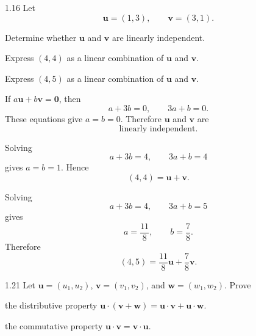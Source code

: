 \documentclass[11pt,oneside]{article}
\begin{document}
\begin{problem}{1.16}
Let
\[
    \mathbf u=(1,3),
    \qquad
    \mathbf v=(3,1).
\]
\begin{problemsubparts}
    \item Determine whether $\mathbf u$ and $\mathbf v$ are linearly independent.
    \item Express $(4,4)$ as a linear combination of $\mathbf u$ and $\mathbf v$.
    \item Express $(4,5)$ as a linear combination of $\mathbf u$ and $\mathbf v$.
\end{problemsubparts}
\end{problem}

\begin{solution}
\begin{problemsubparts}
    \item If $a\mathbf u+b\mathbf v=\mathbf 0$, then
    \[
        a+3b=0,
        \qquad
        3a+b=0.
    \]
    These equations give $a=b=0$. Therefore $\mathbf u$ and $\mathbf v$ are
    \[
        \boxed{\text{linearly independent}}.
    \]

    \item Solving
    \[
        a+3b=4,
        \qquad
        3a+b=4
    \]
    gives $a=b=1$. Hence
    \[
        \boxed{(4,4)=\mathbf u+\mathbf v}.
    \]

    \item Solving
    \[
        a+3b=4,
        \qquad
        3a+b=5
    \]
    gives
    \[
        a=\frac{11}{8},
        \qquad
        b=\frac{7}{8}.
    \]
    Therefore
    \[
        \boxed{(4,5)=\frac{11}{8}\mathbf u+\frac{7}{8}\mathbf v}.
    \]
\end{problemsubparts}
\end{solution}

\begin{problem}{1.21}
Let $\mathbf u=(u_1,u_2)$, $\mathbf v=(v_1,v_2)$, and $\mathbf w=(w_1,w_2)$. Prove
\begin{problemsubparts}
    \item the distributive property $\mathbf u\cdot(\mathbf v+\mathbf w)=\mathbf u\cdot\mathbf v+\mathbf u\cdot\mathbf w$.
    \item the commutative property $\mathbf u\cdot\mathbf v=\mathbf v\cdot\mathbf u$.
\end{problemsubparts}
\end{problem}
\end{document}

